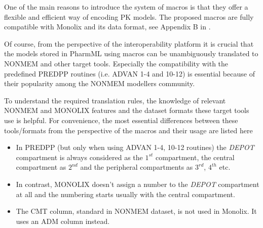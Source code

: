 One of the main reasons to introduce the system of macros is that they offer a flexible 
and efficient way of encoding PK models. The proposed macros are fully compatible with 
Monolix and its data format, see Appendix B in \cite{Monolix4.3.2UserGuide:2014}. 

Of course, from the perspective of the interoperability platform \marginpar{\HandCuffLeft}
it is crucial that the models stored in PharmML using macros can be unambiguously translated 
to NONMEM and other target tools. Especially the compatibility with the predefined PREDPP 
routines (i.e. ADVAN 1-4 and 10-12) is essential because of their popularity among the 
NONMEM modellers community. 

To understand the required translation rules, the knowledge of relevant NONMEM and 
MONOLIX features and the dataset formats these target tools use is helpful. 
For convenience, the most essential differences between these tools/formats from the 
perspective of the macros and their usage are listed here
\begin{itemize}
\item
In PREDPP (but only when using ADVAN 1-4, 10-12 routines) the \emph{DEPOT} 
compartment is always considered as the $1^{st}$ compartment, the central compartment 
as $2^{nd}$ and the peripheral compartments as $3^{rd}$, $4^{th}$ etc. 
\item
In contrast, MONOLIX doesn't assign a number to the \emph{DEPOT} 
compartment at all and the numbering starts usually with the central compartment. 
\item
The CMT column, standard in NONMEM dataset, is not used in Monolix. It uses an ADM 
column instead.
\end{itemize}



